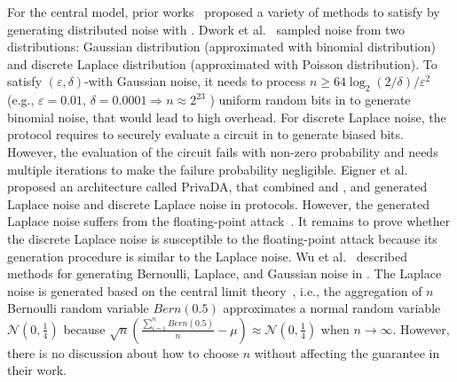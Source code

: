 For the central \differentialprivacy model, prior works~\cite{dwork2006our, eigner2014differentially,wu2016inherit,jayaraman2018distributed,knott2021crypten,yuan2021practical,eriguchi2021efficient} proposed a variety of methods to satisfy \differentialprivacy by generating distributed noise with \smpc.
Dwork et al.~\cite{dwork2006our} sampled noise from two distributions: Gaussian distribution (approximated with binomial distribution) and discrete Laplace distribution (approximated with Poisson distribution).
To satisfy $\left(\varepsilon ,\delta \right) $-\differentialprivacy with Gaussian noise, it needs to process $n\geq 64 \log_2{\left(2/\delta \right) }/\varepsilon ^2$ (e.g., $\varepsilon =0.01 \text{, }\delta=0.0001\Rightarrow n\approx 2^{23}$ ) uniform random bits in \smpc to generate binomial noise, that would lead to high \smpc overhead.
For discrete Laplace noise, the protocol requires to securely evaluate a circuit in \smpc to generate biased bits. However, the evaluation of the circuit fails with non-zero probability and needs multiple iterations to make the failure probability negligible.
Eigner et al.~\cite{eigner2014differentially} proposed an architecture called PrivaDA, that combined \differentialprivacy and \smpc, and generated Laplace noise and discrete Laplace noise in \smpc protocols. However, the generated Laplace noise suffers from the floating-point attack~\cite{mironov2012significance}. It remains to prove whether the discrete Laplace noise is susceptible to the floating-point attack because its generation procedure is similar to the Laplace noise.
Wu et al.~\cite{wu2016inherit} described methods for generating Bernoulli, Laplace, and Gaussian noise in \smpc. The Laplace noise is generated based on the central limit theory~\cite[Example 10.3.2]{athreya2006measure}, i.e., the aggregation of $n$ Bernoulli random variable $Bern\left(0.5\right)$ approximates a normal random variable $\mathcal{N} \left(0,\frac{1}{4}\right)$ because $\sqrt{n}\left(\frac{\sum_{i = 1}^{n}  Bern\left(0.5\right) }{n}-\mu\right) \approx \mathcal{N} \left(0,\frac{1}{4}\right)   $ when $n \rightarrow \infty $. However, there is no discussion about how to choose $n$ without affecting the \differentialprivacy guarantee in their work.

